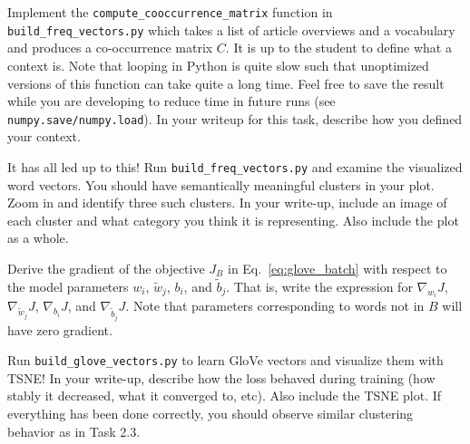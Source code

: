 \documentclass[a4paper,10pt]{article}
\begin{document}
\vspace{5pt}
\begin{taskbox}
 Implement the \texttt{compute\_cooccurrence\_matrix} function in \texttt{build\_freq\_vectors.py} which takes a list of article overviews and a vocabulary and produces a co-occurrence matrix $C$. It is up to the student to define what a context is. Note that looping in Python is quite slow such that unoptimized versions of this function can take quite a long time. Feel free to save the result while you are developing to reduce time in future runs (see \texttt{numpy.save/numpy.load}). In your writeup for this task, describe how you defined your context.

\end{taskbox}
\vspace{5pt}

\vspace{5pt}
\begin{taskbox}
 It has all led up to this! Run \texttt{build\_freq\_vectors.py} and examine the visualized word vectors. You should have semantically meaningful clusters in your plot. Zoom in and identify three such clusters. In your write-up, include an image of each cluster and what category you think it is representing. Also include the plot as a whole.
\end{taskbox}
\vspace{5pt}

\vspace{5pt}
\begin{taskbox}
 Derive the gradient of the objective $J_B$ in Eq.~\ref{eq:glove_batch} with respect to the model parameters $w_i$, $\tilde{w}_j$, $b_i$, and $\tilde{b}_j$. That is, write the expression for $\nabla_{w_i}J$, $\nabla_{\tilde{w}_j}J$, $\nabla_{b_i}J$, and $\nabla_{\tilde{b}_j}J$. Note that parameters corresponding to words not in $B$ will have zero gradient. 
\end{taskbox} 
\vspace{5pt}

\vspace{5pt}
\begin{taskbox}
 Run \texttt{build\_glove\_vectors.py} to learn GloVe vectors and visualize them with TSNE! In your write-up, describe how the loss behaved during training (how stably it decreased, what it converged to, etc). Also include the TSNE plot. If everything has been done correctly, you should observe similar clustering behavior as in Task 2.3.
\end{taskbox} 
\vspace{5pt}
\end{document}
